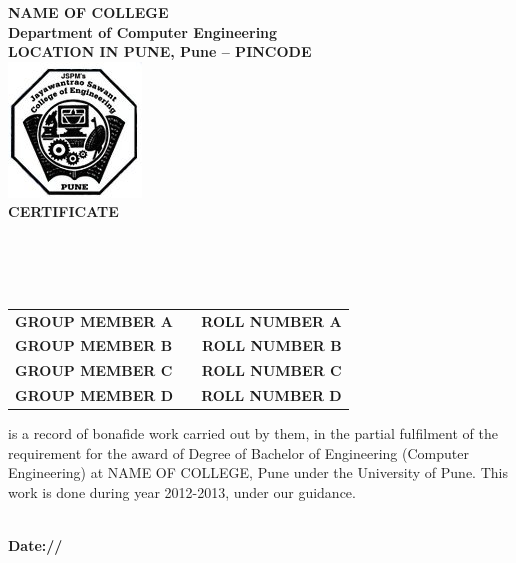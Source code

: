 \begin{center}
\thispagestyle{empty}

\LARGE{\textbf{NAME OF COLLEGE}} \\ 
\large{\textbf{Department of Computer Engineering}}\\
\large{\textbf{LOCATION IN PUNE, Pune – PINCODE}}\\[0.5cm]

\includegraphics[scale=0.5]{project/images/jscoe_logo}\\[0.5cm]

{\Huge \textbf{CERTIFICATE}}\\[0.5cm]
\end{center}
\linespread{1.13}
\large{\\[0.2cm]
\textbf{\Large{}}\\[0.2cm]
\\[0.2cm]
\begin{table}[h]
\centering
\large{
\begin{tabular}{>{\bfseries}lc>{\bfseries}r}
GROUP MEMBER A & & ROLL NUMBER A\\GROUP MEMBER B & & ROLL NUMBER B\\GROUP MEMBER C & & ROLL NUMBER C\\GROUP MEMBER D & & ROLL NUMBER D\\
\end{tabular}}
\end{table}
 is a record of bonafide work carried out by them, in the partial
 fulfilment of the requirement for the award of Degree of Bachelor of
 Engineering (Computer Engineering) at NAME OF COLLEGE, Pune under the 
 University of Pune. This work is done
 during year 2012-2013, under our guidance.}\\[0.5cm]
\large{\textbf{Date:\hspace*{1.0cm}/\hspace*{1.0cm}/}}\\
